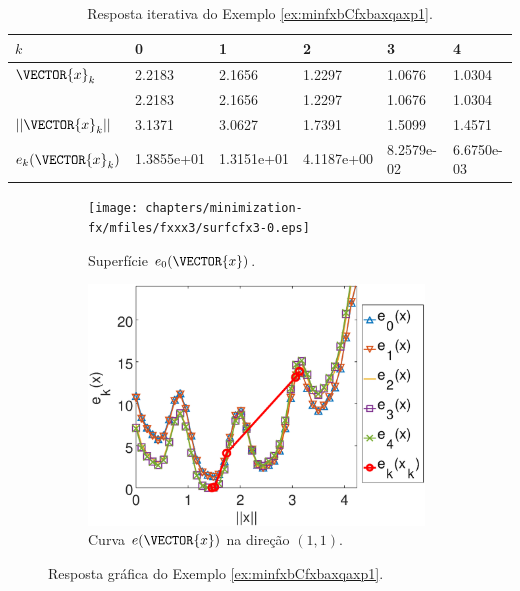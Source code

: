 \begin{table}[h!]
\centering
\begin{tabular}{|l|l|l|l|l|l|}
\hline
$k$ & 0 & 1 & 2 & 3 & 4 \\ \hline
$\VECTOR{x}_k$ & 2.2183 & 2.1656 & 1.2297 & 1.0676 & 1.0304 \\ 
~              & 2.2183 & 2.1656 & 1.2297 & 1.0676 & 1.0304 \\ \hline
$||\VECTOR{x}_k||$ & 3.1371 & 3.0627 & 1.7391 & 1.5099 & 1.4571 \\ \hline
$e_{k}(\VECTOR{x}_k)$ & 1.3855e+01 & 1.3151e+01 & 4.1187e+00 & 8.2579e-02 & 6.6750e-03 \\ \hline
\end{tabular}
\caption{Resposta iterativa do Exemplo \ref{ex:minfxbCfxbaxqaxp1}.}
\label{table:ex:minfxbCfxbaxqaxp3}
\end{table}
\begin{figure}[h!]
     \centering
     \begin{subfigure}[b]{0.49\textwidth}
         \centering
         \texttt{[image: chapters/minimization-fx/mfiles/fxxx3/surfcfx3-0.eps]}
         \caption{Superfície $e_0(\VECTOR{x})$.}
         \label{fig:ex:minfxbCfxbaxqaxp3:a}
     \end{subfigure}
     \hfill
     \begin{subfigure}[b]{0.49\textwidth}
         \centering
         \includegraphics[width=0.98\textwidth]{chapters/minimization-fx/mfiles/fxxx3/plotfx3all.eps}
         \caption{Curva $e(\VECTOR{x})$ na direção $(1,1)$.}
         \label{fig:ex:minfxbCfxbaxqaxp3:b}
     \end{subfigure}
        \caption{Resposta gráfica do Exemplo \ref{ex:minfxbCfxbaxqaxp1}. }
        \label{fig:ex:minfxbCfxbaxqaxp3}
\end{figure}


